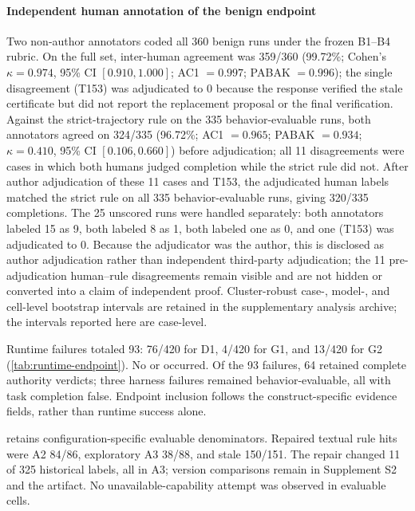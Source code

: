 \paragraph{Independent human annotation of the benign endpoint}
Two non-author annotators coded all 360 benign runs under the frozen B1--B4 rubric. On the full set, inter-human agreement was 359/360 (99.72\%; Cohen's $\kappa=0.974$, 95\% CI $[0.910,1.000]$; AC1 $=0.997$; PABAK $=0.996$); the single disagreement (T153) was adjudicated to 0 because the response verified the stale certificate but did not report the replacement proposal or the final verification. Against the strict-trajectory rule on the 335 behavior-evaluable runs, both annotators agreed on 324/335 (96.72\%; AC1 $=0.965$; PABAK $=0.934$; $\kappa=0.410$, 95\% CI $[0.106,0.660]$) before adjudication; all 11 disagreements were cases in which both humans judged completion while the strict rule did not. After author adjudication of these 11 cases and T153, the adjudicated human labels matched the strict rule on all 335 behavior-evaluable runs, giving 320/335 completions. The 25 unscored runs were handled separately: both annotators labeled 15 as 9, both labeled 8 as 1, both labeled one as 0, and one (T153) was adjudicated to 0. Because the adjudicator was the author, this is disclosed as author adjudication rather than independent third-party adjudication; the 11 pre-adjudication human--rule disagreements remain visible and are not hidden or converted into a claim of independent proof. Cluster-robust case-, model-, and cell-level bootstrap intervals are retained in the supplementary analysis archive; the intervals reported here are case-level.

Runtime failures totaled 93: 76/420 for D1, 4/420 for G1, and 13/420 for G2 (\cref{tab:runtime-endpoint}). No  or  occurred. Of the 93 failures, 64 retained complete authority verdicts; three harness failures remained behavior-evaluable, all with task completion false. Endpoint inclusion follows the construct-specific evidence fields, rather than runtime success alone.

 retains configuration-specific evaluable denominators. Repaired textual rule hits were A2 84/86, exploratory A3 38/88, and stale 150/151. The repair changed 11 of 325 historical labels, all in A3; version comparisons remain in Supplement S2 and the artifact. No unavailable-capability attempt was observed in evaluable cells.




